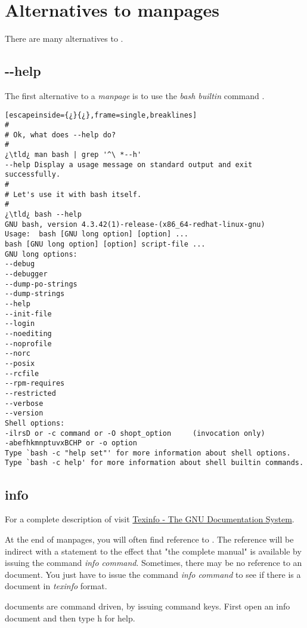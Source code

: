 \section{Alternatives to manpages}

There are many alternatives to .

\subsection{-{}-{}help}

The first alternative to a \emph{manpage} is to use the \emph{bash builtin} command .

\begin{lstlisting}[escapeinside={¿}{¿},frame=single,breaklines]
#
# Ok, what does --help do?
#
¿\tld¿ man bash | grep '^\ *--h'
--help Display a usage message on standard output and exit successfully.
#
# Let's use it with bash itself.
#
¿\tld¿ bash --help
GNU bash, version 4.3.42(1)-release-(x86_64-redhat-linux-gnu)
Usage:	bash [GNU long option] [option] ...
bash [GNU long option] [option] script-file ...
GNU long options:
--debug
--debugger
--dump-po-strings
--dump-strings
--help
--init-file
--login
--noediting
--noprofile
--norc
--posix
--rcfile
--rpm-requires
--restricted
--verbose
--version
Shell options:
-ilrsD or -c command or -O shopt_option		(invocation only)
-abefhkmnptuvxBCHP or -o option
Type `bash -c "help set"' for more information about shell options.
Type `bash -c help' for more information about shell builtin commands.

\end{lstlisting}

\subsection{info}

For a complete description of  visit \href{https://www.gnu.org/software/texinfo/}{Texinfo - The GNU Documentation System}.

At the end of manpages, you will often find reference to . The reference will be indirect with a statement to the effect that "the complete manual" is available by issuing the command \emph{info command}. Sometimes, there may be no reference to an  document. You just have to issue the command \emph{info command} to see if there is a document in \emph{texinfo} format.

 documents are command driven, by issuing command keys. First open an info document and then type h for help.

